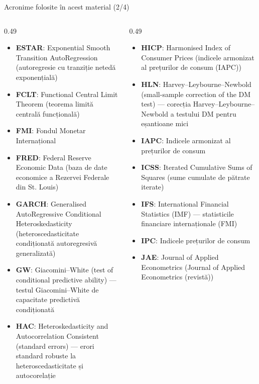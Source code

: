 \begin{frame}{Acronime folosite în acest material (2/4)}
\begin{columns}[T]
\begin{column}{0.49\textwidth}
\begin{itemize}\setlength{\itemsep}{0pt}
    \item \textbf{ESTAR}: Exponential Smooth Transition AutoRegression (autoregresie cu tranziție netedă exponențială)
    \item \textbf{FCLT}: Functional Central Limit Theorem (teorema limită centrală funcțională)
    \item \textbf{FMI}: Fondul Monetar Internațional
    \item \textbf{FRED}: Federal Reserve Economic Data (baza de date economice a Rezervei Federale din St. Louis)
    \item \textbf{GARCH}: Generalised AutoRegressive Conditional Heteroskedasticity (heteroscedasticitate condiționată autoregresivă generalizată)
    \item \textbf{GW}: Giacomini–White (test of conditional predictive ability) — testul Giacomini–White de capacitate predictivă condiționată
    \item \textbf{HAC}: Heteroskedasticity and Autocorrelation Consistent (standard errors) — erori standard robuste la heteroscedasticitate și autocorelație
\end{itemize}
\end{column}
\begin{column}{0.49\textwidth}
\begin{itemize}\setlength{\itemsep}{0pt}
    \item \textbf{HICP}: Harmonised Index of Consumer Prices (indicele armonizat al prețurilor de consum (IAPC))
    \item \textbf{HLN}: Harvey–Leybourne–Newbold (small-sample correction of the DM test) — corecția Harvey–Leybourne–Newbold a testului DM pentru eșantioane mici
    \item \textbf{IAPC}: Indicele armonizat al prețurilor de consum
    \item \textbf{ICSS}: Iterated Cumulative Sums of Squares (sume cumulate de pătrate iterate)
    \item \textbf{IFS}: International Financial Statistics (IMF) — statisticile financiare internaționale (FMI)
    \item \textbf{IPC}: Indicele prețurilor de consum
    \item \textbf{JAE}: Journal of Applied Econometrics (Journal of Applied Econometrics (revistă))
\end{itemize}
\end{column}
\end{columns}
\end{frame}
